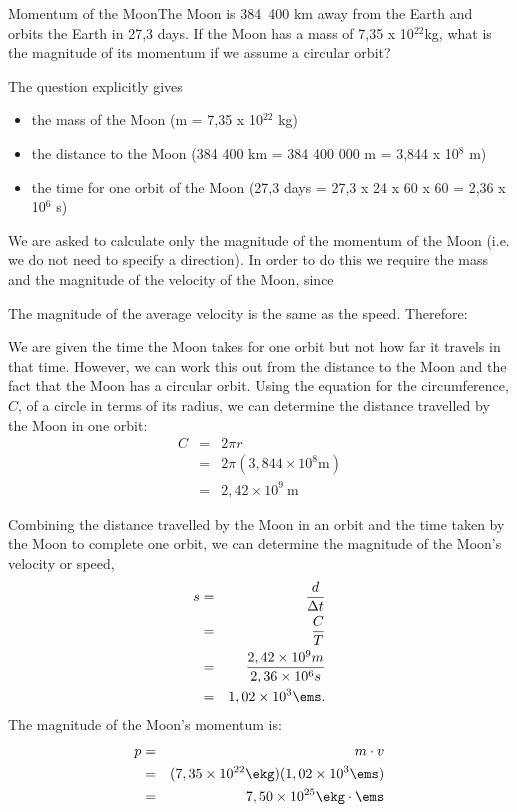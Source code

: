 \begin{wex}{Momentum of the Moon}{The Moon is 384~400 km away from the Earth and orbits the Earth in 27,3 days. If the Moon has a mass of 7,35 x 10$^{22}$kg, what is the magnitude of its momentum if we assume a circular orbit?}{ The question explicitly gives
\begin{itemize}
\item the mass of the Moon (m = 7,35 x 10$^{22}$ kg)
\item the distance to the Moon (384 400 km = 384 400 000 m = 3,844 x 10$^8$ m)
\item the time for one orbit of the Moon (27,3 days = 27,3 x 24 x 60 x 60 = 2,36 x 10$^6$ s)
\end{itemize}

We are asked to calculate only the magnitude of the momentum of the Moon (i.e. we do not need to specify a direction). In order to do this we require the mass and the magnitude of the velocity of the Moon, since

The magnitude of the average velocity is the same as the speed. Therefore:

We are given the time the Moon takes for one orbit but not how far it travels in that time. However, we can work this out from the distance to the Moon and the fact that the Moon has a circular orbit. Using the equation for the circumference, $C$, of a circle in terms of its radius, we can determine the distance travelled by the Moon in one
orbit:
\begin{eqnarray*}
C&=&2\pi r\\
&=&2\pi (3,844\times10^8 \mathrm{m})\\
&=& 2,42\times10^{9}\ \mathrm{m}
\end{eqnarray*}

Combining the distance travelled by the Moon in an orbit and the time
taken by the Moon to complete one orbit, we can determine the
magnitude of the Moon's velocity or speed,
\begin{eqnarray*}
s &=& \frac{d}{\Delta t}\\
&=& \frac{C}{T}\\
&=& \frac{2,42 \times 10^9 m}{2,36 \times 10^6 s}\\
&=& 1,02\times 10^{3}\ems.
\end{eqnarray*}
The magnitude of the Moon's momentum is:
\begin{eqnarray*}
p &=& m \cdot v\\
&=& (7,35\times 10^{22} \ekg)(1,02\times 10^{3} \ems)\\
&=& 7,50 \times 10^{25}\ekg \cdot \ems
\end{eqnarray*}}
\end{wex}

